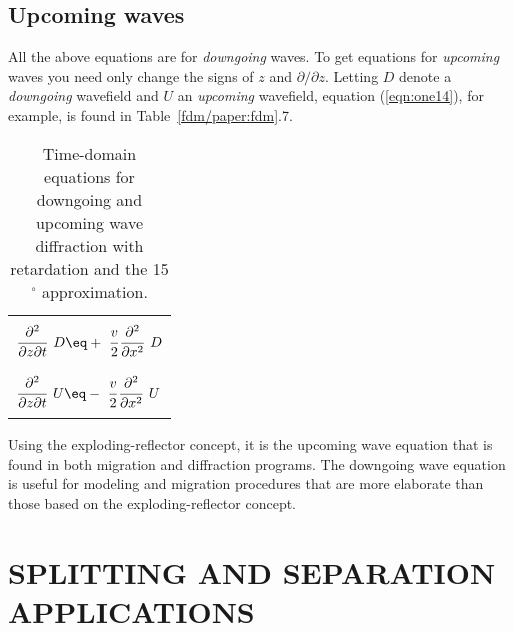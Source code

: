 {\subsection{Upcoming waves}
\par
All the above equations are for 
{\em  downgoing}
waves.
To get equations for
{\em  upcoming}
waves you need only change the
signs of  $z$  and  $ \partial / \partial z $.
Letting  $D$  denote a 
{\em  downgoing}
wavefield and  $U$  an
{\em  upcoming}
wavefield, equation (\ref{eqn:one14}), for example,
is found in Table~\ref{fdm/paper:fdm}.7.
\begin{table}
\begin{center}
\begin{tabular}{|l|}     \hline
      \\
$\displaystyle {\strut\partial^2 \over
  \partial z \partial t} \ D \eq
  +\ \displaystyle {\strut v\over 2} 
  \displaystyle {\strut\partial^2 \over\partial x^2} \ D$
     \hspace{.2in} \\
       \\   \hline
       \\
$\displaystyle {\strut\partial^2 \over
  \partial z \partial t} \ U \eq
  -\ \displaystyle {\strut v\over 2} 
  \displaystyle {\strut\partial^2 \over\partial x^2} \ U$
     \hspace{.2in} \\
        \\      \hline
\end{tabular}
\end{center}
\label{eqn:1-6}
\caption{Time-domain equations
for downgoing and upcoming wave diffraction with
retardation and the 15$^\circ$ approximation.}
\end{table}
\par
Using the exploding-reflector concept,
it is the upcoming
wave equation that is found in both migration and diffraction programs.
The downgoing wave equation is useful
for modeling and migration procedures that are more elaborate
than those based on the exploding-reflector concept.
\section{SPLITTING AND SEPARATION APPLICATIONS}
}
